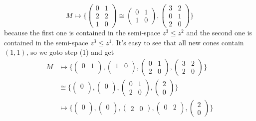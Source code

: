 \documentclass[12pt]{article}
\theoremstyle{definition}
\theoremstyle{plain}
\begin{document}
\[
	M\mapsto \biggl\{
	\begin{pmatrix}
		0&1\\
		2&2\\
		1&0
	\end{pmatrix}\cong
	\begin{pmatrix}
		0&1\\
		1&0
	\end{pmatrix},
	\begin{pmatrix}
		3&2\\
		0&1\\
		2&0
	\end{pmatrix}
\biggr\}
\]
because the first one is contained in the semi-space $z^3\leq z^2$
and the second one is contained in the semi-space $z^3\leq z^1$.
It's easy to see that all new cones contain $(1,1)$, so we goto step (1) 
and get
\begin{align*}
	M&\mapsto 
	\biggl\{
	\begin{pmatrix}
		0&1\\
	\end{pmatrix},
	\begin{pmatrix}
		1&0\\
	\end{pmatrix},
	\begin{pmatrix}
		0&1\\
		2&0
	\end{pmatrix},
	\begin{pmatrix}
		3&2\\
		2&0
	\end{pmatrix}
	\biggr\}\\
	 &\cong
	\biggl\{
	\begin{pmatrix}
		0\\
	\end{pmatrix},
	\begin{pmatrix}
		0\\
	\end{pmatrix},
	\begin{pmatrix}
		0&1\\
		2&0
	\end{pmatrix},
	\begin{pmatrix}
		2\\
		0
	\end{pmatrix}
	\biggr\}\\
	&\mapsto
	\biggl\{
	\begin{pmatrix}
		0\\
	\end{pmatrix},
	\begin{pmatrix}
		0\\
	\end{pmatrix},
	\begin{pmatrix}
		2&0
	\end{pmatrix},
	\begin{pmatrix}
		0&2\\
	\end{pmatrix},
	\begin{pmatrix}
		2\\
		0
	\end{pmatrix}
	\biggr\}
\end{align*}
\end{document}
